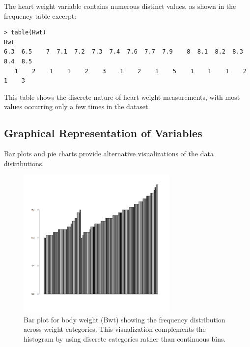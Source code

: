 \documentclass[a4paper,12pt]{article}
\begin{document}
The heart weight variable contains numerous distinct values, as shown in the frequency table excerpt:

\begin{lstlisting}[caption={Partial frequency table for heart weight (Hwt)}, label={lst:hwt_freq}]
> table(Hwt)
Hwt
6.3  6.5    7  7.1  7.2  7.3  7.4  7.6  7.7  7.9    8  8.1  8.2  8.3  8.4  8.5     
   1    2    1    1    2    3    1    2    1    5    1    1    1    2    1    3     
\end{lstlisting}

This table shows the discrete nature of heart weight measurements, with most values occurring only a few times in the dataset.

\subsection{Graphical Representation of Variables}
\label{subsec:graphical}

Bar plots and pie charts provide alternative visualizations of the data distributions.

\begin{figure}[H]
    \centering
    \includegraphics[width=0.7\textwidth]{barplotbtw.png}
    \caption{Bar plot for body weight (Bwt) showing the frequency distribution across weight categories. This visualization complements the histogram by using discrete categories rather than continuous bins.}
    \label{fig:barplotbtw}
\end{figure}
\end{document}
